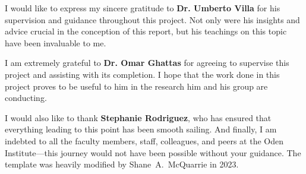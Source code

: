 
I would like to express my sincere gratitude to \textbf{Dr. Umberto Villa} for his supervision and guidance throughout this project. Not only were his insights and advice crucial in the conception of this report, but his teachings on this topic have been invaluable to me.

I am extremely grateful to \textbf{Dr. Omar Ghattas} for agreeing to supervise this project and assisting with its completion. I hope that the work done in this project proves to be useful to him in the research him and his group are conducting.

I would also like to thank \textbf{Stephanie Rodriguez}, who has ensured that everything leading to this point has been smooth sailing. And finally, I am indebted to all the faculty members, staff, colleagues, and peers at the Oden Institute---this journey would not have been possible without your guidance.
The template was heavily modified by Shane~A.~McQuarrie in 2023.
